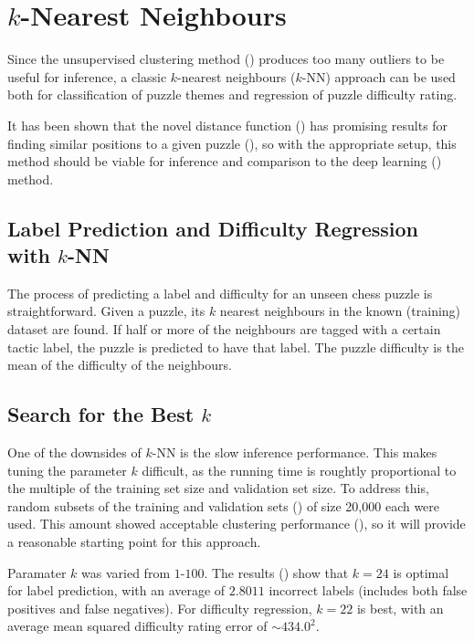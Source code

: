 \pagebreak

\section{$k$-Nearest Neighbours}\label{treeS3}

Since the unsupervised clustering method () produces too many
outliers to be useful for inference, a classic $k$-nearest neighbours ($k$-NN)
approach \citep{fix1985discriminatory} can be used both for classification of
puzzle themes and regression of puzzle difficulty rating.

It has been shown that the novel distance function () has
promising results for finding similar positions to a given puzzle
(), so with the appropriate setup, this method should be viable
for inference and comparison to the deep learning () method.

\subsection{Label Prediction and Difficulty Regression with $k$-NN}

The process of predicting a label and difficulty for an unseen chess puzzle is
straightforward. Given a puzzle, its $k$ nearest neighbours in the known
(training) dataset are found. If half or more of the neighbours are tagged with
a certain tactic label, the puzzle is predicted to have that label. The puzzle
difficulty is the mean of the difficulty of the neighbours.

\subsection{Search for the Best $k$}\label{treeS31}

One of the downsides of $k$-NN is the slow inference performance. This makes
tuning the parameter $k$ difficult, as the running time is roughtly
proportional to the multiple of the training set size and validation set size.
To address this, random subsets of the training and validation sets
() of size 20,000 each were used. This amount showed acceptable
clustering performance (), so it will provide a reasonable
starting point for this approach.

Paramater $k$ was varied from $1$-$100$. The results () show that
$k=24$ is optimal for label prediction, with an average of $2.8011$ incorrect
labels (includes both false positives and false negatives). For difficulty
regression, $k=22$ is best, with an average mean squared difficulty rating
error of $\sim\!434.0^2$. 

